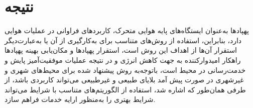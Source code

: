 \section{نتیجه}
پهپادها به‌عنوان ایستگاه‌های پایه هوایی متحرک، کاربردهای فراوانی در عملیات هوایی دارد، بنابراین، استفاده از روش‌های متناسب برای به‌کارگیری از آن یا به‌عبارت‌دیگر استقرار آن‌ها از اهداف این روش است، استقرار پهپادها و مکان‌یابی بهینه پهپادها راهکار امیدوارکننده به جهت کاهش انرژی و در نتیجه عملیات موفقیت‌آمیز پایش و خدمت‌رسانی در محیط است، باتوجه‌به روش پیشنهاد شده برای محیط‌های شهری و غیرشهری در صورت پیش آمد بلایای طبیعی و غیرطبیعی می‌تواند کاربردی باشد، از طرفی همان‌طور که اشاره شد، استفاده از الگوریتم‌های متناسب با شرایط می‌تواند شرایط بهتری را به‌منظور ارایه خدمات فراهم سازد.


